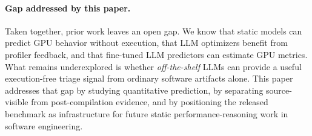 \paragraph{Gap addressed by this paper.}
Taken together, prior work leaves an open gap.
We know that static models can predict GPU behavior without execution, that LLM optimizers benefit from profiler feedback, and that fine-tuned LLM predictors can estimate GPU metrics.
What remains underexplored is whether \emph{off-the-shelf} LLMs can provide a useful execution-free triage signal from ordinary software artifacts alone.
This paper addresses that gap by studying quantitative \rai prediction, by separating source-visible from post-compilation evidence, and by positioning the released benchmark as infrastructure for future static performance-reasoning work in software engineering.
